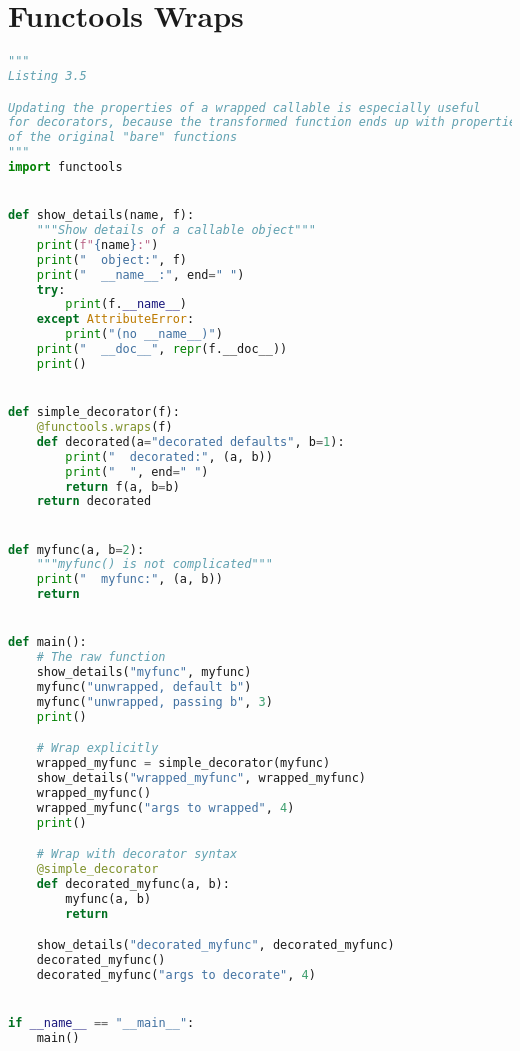 \documentclass[a4paper,landscape]{report}
\begin{document}
\section{Functools Wraps}
\begin{lstlisting}[language=Python]
"""
Listing 3.5

Updating the properties of a wrapped callable is especially useful
for decorators, because the transformed function ends up with properties
of the original "bare" functions
"""
import functools


def show_details(name, f):
    """Show details of a callable object"""
    print(f"{name}:")
    print("  object:", f)
    print("  __name__:", end=" ")
    try:
        print(f.__name__)
    except AttributeError:
        print("(no __name__)")
    print("  __doc__", repr(f.__doc__))
    print()


def simple_decorator(f):
    @functools.wraps(f)
    def decorated(a="decorated defaults", b=1):
        print("  decorated:", (a, b))
        print("  ", end=" ")
        return f(a, b=b)
    return decorated


def myfunc(a, b=2):
    """myfunc() is not complicated"""
    print("  myfunc:", (a, b))
    return


def main():
    # The raw function
    show_details("myfunc", myfunc)
    myfunc("unwrapped, default b")
    myfunc("unwrapped, passing b", 3)
    print()

    # Wrap explicitly
    wrapped_myfunc = simple_decorator(myfunc)
    show_details("wrapped_myfunc", wrapped_myfunc)
    wrapped_myfunc()
    wrapped_myfunc("args to wrapped", 4)
    print()

    # Wrap with decorator syntax
    @simple_decorator
    def decorated_myfunc(a, b):
        myfunc(a, b)
        return

    show_details("decorated_myfunc", decorated_myfunc)
    decorated_myfunc()
    decorated_myfunc("args to decorate", 4)


if __name__ == "__main__":
    main()

\end{lstlisting}
\end{document}
